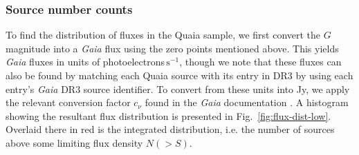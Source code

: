 \documentclass[fleqn,usenatbib]{mnras}
\begin{document}
        \subsubsection{Source number counts}
        \label{subs:source-number-counts}
            To find the distribution of fluxes in the Quaia sample, we first convert the $G$ magnitude into a \textit{Gaia} flux using the zero points mentioned above.
            This yields \textit{Gaia} fluxes in units of photoelectrons$\,\text{s}^{-1}$, though we note that these fluxes can also be found by matching each Quaia source with its entry in DR3 by using each entry's \textit{Gaia} DR3 source identifier.
            To convert from these units into Jy, we apply the relevant conversion factor $c_\nu$ found in the \textit{Gaia} documentation \citep{gaiadocumentation}.
            A histogram showing the resultant flux distribution is presented in Fig.~\ref{fig:flux-dist-low}.
            Overlaid there in red is the integrated distribution, i.e. the number of sources above some limiting flux density $N (>S)$. 
            
\end{document}
